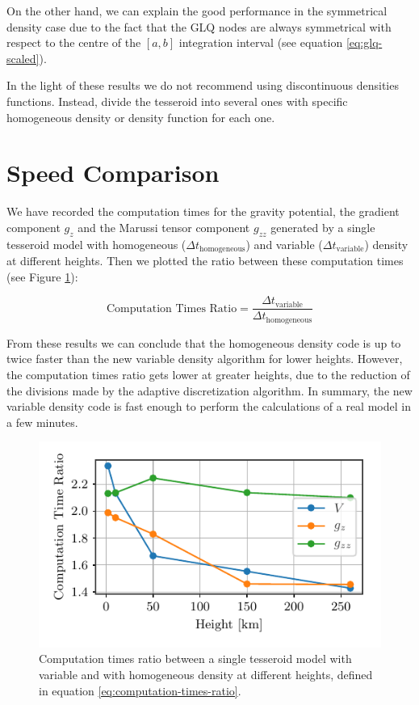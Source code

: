 \documentclass[extra]{gji}
\begin{document}
On the other hand, we can explain the good performance in the symmetrical density case due to the fact that the GLQ nodes are always symmetrical with respect to the centre of the $[a,b]$ integration interval (see equation \ref{eq:glq-scaled}).

In the light of these results we do not recommend using discontinuous densities functions. Instead, divide the tesseroid into several ones with specific homogeneous density or density function for each one.



\section{Speed Comparison}

We have recorded the computation times for the gravity potential, the gradient component $g_z$ and the Marussi tensor component $g_{zz}$ generated by a single tesseroid model with homogeneous ($\Delta t_\text{homogeneous}$) and variable ($\Delta 
t_\text{variable}$) density at different heights. Then we plotted the ratio between these computation times (see Figure \ref{fig:speed-comparison}): 

\begin{equation}
    \text{Computation Times Ratio} =
        \frac{\Delta t_\text{variable}}{\Delta t_\text{homogeneous}}
    \label{eq:computation-times-ratio}
\end{equation}

From these results we can conclude that the homogeneous density code is up to twice faster than the new variable density algorithm for lower heights. However, the computation times ratio gets lower at greater heights, due to the reduction of the divisions made by the adaptive discretization algorithm. In summary, the new variable density code is fast enough to perform the calculations of a real model in a few minutes. 

\begin{figure}
\centering
\includegraphics[width=0.9\linewidth]{figures/speed-comparison.pdf}
\caption{Computation times ratio between a single tesseroid model with variable and with homogeneous density at different heights, defined in equation \ref{eq:computation-times-ratio}.}
\label{fig:speed-comparison}
\end{figure}
\end{document}
